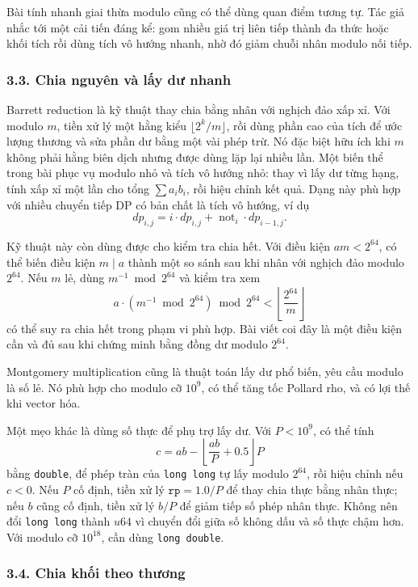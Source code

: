 \documentclass[11pt]{article}
\begin{document}
Bài tính nhanh giai thừa modulo cũng có thể dùng quan điểm tương tự. Tác giả
nhắc tới một cải tiến đáng kể: gom nhiều giá trị liên tiếp thành đa thức hoặc
khối tích rồi dùng tích vô hướng nhanh, nhờ đó giảm chuỗi nhân modulo nối tiếp.

\subsubsection*{3.3. Chia nguyên và lấy dư nhanh}

Barrett reduction là kỹ thuật thay chia bằng nhân với nghịch đảo xấp xỉ. Với
modulo \(m\), tiền xử lý một hằng kiểu \(\lfloor 2^k/m\rfloor\), rồi dùng phần
cao của tích để ước lượng thương và sửa phần dư bằng một vài phép trừ. Nó đặc
biệt hữu ích khi \(m\) không phải hằng biên dịch nhưng được dùng lặp lại nhiều
lần. Một biến thể trong bài phục vụ modulo nhỏ và tích vô hướng nhỏ: thay vì
lấy dư từng hạng, tính xấp xỉ một lần cho tổng \(\sum a_i b_i\), rồi hiệu chỉnh
kết quả. Dạng này phù hợp với nhiều chuyển tiếp DP có bản chất là tích vô hướng,
ví dụ
\[
  dp_{i,j}=i\cdot dp_{i,j}+\operatorname{not}_i\cdot dp_{i-1,j}.
\]

Kỹ thuật này còn dùng được cho kiểm tra chia hết. Với điều kiện \(a m<2^{64}\),
có thể biến điều kiện \(m\mid a\) thành một so sánh sau khi nhân với nghịch đảo
modulo \(2^{64}\). Nếu \(m\) lẻ, dùng \(m^{-1}\bmod 2^{64}\) và kiểm tra xem
\[
  a\cdot (m^{-1}\bmod 2^{64}) \bmod 2^{64} < \left\lfloor\frac{2^{64}}{m}\right\rfloor
\]
có thể suy ra chia hết trong phạm vi phù hợp. Bài viết coi đây là một điều kiện
cần và đủ sau khi chứng minh bằng đồng dư modulo \(2^{64}\).

Montgomery multiplication cũng là thuật toán lấy dư phổ biến, yêu cầu modulo là
số lẻ. Nó phù hợp cho modulo cỡ \(10^9\), có thể tăng tốc Pollard rho, và có
lợi thế khi vector hóa.

Một mẹo khác là dùng số thực để phụ trợ lấy dư. Với \(P<10^9\), có thể tính
\[
  c=ab-\left\lfloor\frac{ab}{P}+0.5\right\rfloor P
\]
bằng \texttt{double}, để phép tràn của \texttt{long long} tự lấy modulo
\(2^{64}\), rồi hiệu chỉnh nếu \(c<0\). Nếu \(P\) cố định, tiền xử lý
\(\texttt{rp}=1.0/P\) để thay chia thực bằng nhân thực; nếu \(b\) cũng cố định,
tiền xử lý \(b/P\) để giảm tiếp số phép nhân thực. Không nên đổi
\texttt{long long} thành \(u64\) vì chuyển đổi giữa số không dấu và số thực
chậm hơn. Với modulo cỡ \(10^{18}\), cần dùng \texttt{long double}.

\subsubsection*{3.4. Chia khối theo thương}
\end{document}
